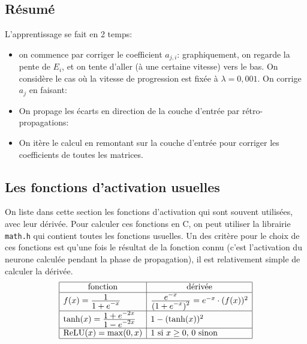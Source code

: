 \documentclass[a4paper]{article}
\def\ffrac#1#2{\frac{\displaystyle #1}{\displaystyle #2}}
\begin{document}
\subsection{Résumé}
L'apprentissage se fait en 2 temps:
\begin{itemize}
\item on commence par corriger le coefficient \(a_{j,i}\):
  graphiquement, on regarde la pente de \(E_i\), et on tente d'aller
  (à une certaine vitesse) vers le bas. On considère le cas où la
  vitesse de progression est fixée à \(\lambda=0,001\). On corrige
  \(a_j\) en faisant:
\begin{center}
\end{center}
\item On propage les écarts en direction de la couche d'entrée par
  rétro-propagations:
\begin{center}
\end{center}
\item On itère le calcul en remontant sur la couche d'entrée pour
  corriger les coefficients de toutes les matrices.
\end{itemize}

\subsection{Les fonctions d'activation usuelles}

On liste dans cette section les fonctions d'activation qui sont
souvent utilisées, avec leur dérivée. Pour calculer ces fonctions en
C, on peut utiliser la librairie \texttt{math.h} qui contient toutes
les fonctions usuelles. Un des critère pour le choix de ces fonctions
est qu'une fois le résultat de la fonction connu (c'est l'activation
du neurone calculée pendant la phase de propagation), il est
relativement simple de calculer la dérivée.
\[
  \begin{array}{|l|l|}
    \hline
    \multicolumn 1{|c}{\text{fonction}} & \multicolumn 1{|c|}{\text{dérivée}} \\
    \hline
    f(x)=\ffrac 1{1+e^{-x}}& \ffrac{e^{-x}}{(1+e^{-x})^2} = e^{-x}\cdot (f(x))^2\\
    \hline
    \operatorname{tanh}(x)=\ffrac{1+e^{-2x}}{1-e^{-2x}} & 1 - (\operatorname{tanh}(x))^2 \\
    \hline
    \operatorname{ReLU}(x) = \max(0,x) & 1 \text { si }x\ge 0\text{, } 0\text{ sinon}\\
    \hline
  \end{array}
\]
\end{document}
